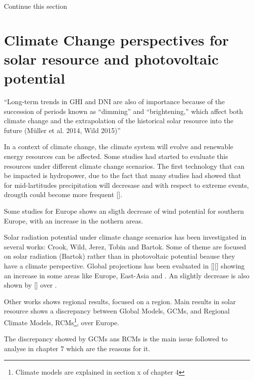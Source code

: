 



{\color{red}Continue this section}

\section{Climate Change perspectives for solar resource and photovoltaic potential}


``Long-term trends in GHI and DNI are also of importance because of the succession of periods known as “dimming” and “brightening,” which affect both climate change and the extrapolation of the historical solar resource into the future (Müller et al. 2014, Wild 2015)''

In a context of climate change, the climate system will evolve and renewable energy resources can be affected. Some studies had started to evaluate this resources under different climate change scenarios. The first technology that can be impacted is hydropower, due to the fact that many studies had showed that for mid-lartitudes precipitation will decresase and with respect to extreme events, drougth could become more frequent [].

Some studies for Europe shows an sligth decrease of wind potential for southern Europe, with an increase in the nothern areas.

Solar radiation potential under climate change scenarios has been investigated in several works: Crook, Wild, Jerez, Tobin and Bartok. Some of theme are focused on solar radiation (Bartok) rather than in photovoltaic potential beause they have a climate perspective. Global projections has been evaluated in [][] showing an increase in some areas like Europe, East-Asia and . An slightly decrease is also shown by [] over .

Other works shows regional results, focused on a region. Main results in solar resource shows a discrepancy between Global Models, GCMs, and Regional Climate Models, RCMs\footnote{Climate models are explained in section x of chapter 4}, over Europe.

The discrepancy showed by GCMs ans RCMs is the main issue followed to analyse in chapter 7 which are the reasons for it.

% 